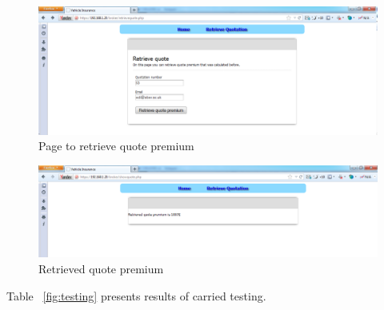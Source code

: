 \documentclass[10pt,a4paper,headinclude=true,twoside]{report}
\begin{document}
\begin{figure}[H]
\centering
\centerline{\includegraphics[scale=0.45]{./retrivequote}}
\caption{Page to retrieve quote premium}
\label{fig:retrivequote}
\end{figure} 

\begin{figure}[H]
\centering
\centerline{\includegraphics[scale=0.45]{./retrievedquote}}
\caption{Retrieved quote premium}
\label{fig:retrievedquote}
\end{figure} 

Table ~\ref{fig:testing} presents results of carried testing. 
\end{document}
